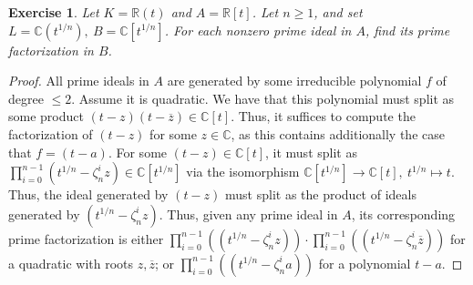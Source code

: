 \documentclass{article}
\newcommand{\bb}[1]{\mathbb{#1}}
\newtheorem{exercise}{Exercise}
\begin{document}
\begin{exercise}
  Let $K = \bb{R}(t)$ and $A = \bb{R}[t]$. Let $n \geq 1$, and set $L = \bb{C}(t^{1/n}), \ B = \bb{C}[t^{1/n}]$. For each nonzero prime ideal in $A$, find its prime factorization in $B$.
\end{exercise}
\begin{proof}
  All prime ideals in $A$ are generated by some irreducible polynomial $f$ of degree $\leq 2$. Assume it is quadratic. We have that this polynomial must split as some product $(t - z)(t - \overline z) \in \bb{C}[t]$. Thus, it suffices to compute the factorization of $(t - z)$ for some $z \in \bb{C}$, as this contains additionally the case that $f = (t - a)$. For some $(t - z) \in \bb{C}[t]$, it must split as $\prod_{i=0}^{n-1}(t^{1/n} - \zeta_{n}^{i}z) \in \bb{C}[t^{1/n}]$ via the isomorphism $\bb{C}[t^{1/n}] \to \bb{C}[t], \ t^{1/n} \mapsto t$. Thus, the ideal generated by $(t-z)$ must split as the product of ideals generated by $(t^{1/n} - \zeta_{n}^{i}z)$. Thus, given any prime ideal in $A$, its corresponding prime factorization is either $\prod_{i=0}^{n-1} ((t^{1/n} - \zeta_{n}^{i}z)) \cdot \prod_{i=0}^{n-1} ((t^{1/n} - \zeta_{n}^{i}\overline z))$ for a quadratic with roots $z, \overline z$; or $\prod_{i=0}^{n-1} ((t^{1/n} - \zeta_{n}^{i}a))$ for a polynomial $t-a$.
\end{proof}

\newpage 
\end{document}
